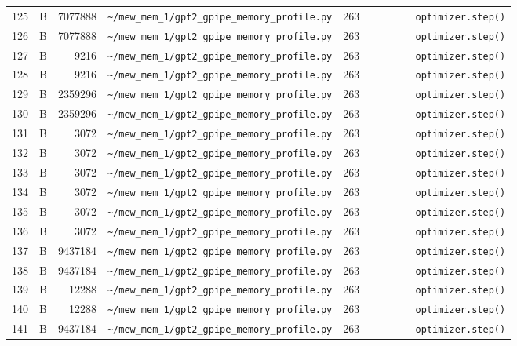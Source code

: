 \documentclass{article}
\begin{document}
\begin{longtable}{r l r p{6.5cm} r p{7.0cm}}
125 & B & 7077888 & \lstinline|~/mew_mem_1/gpt2_gpipe_memory_profile.py| & 263 & \lstinline|        optimizer.step()| \\
126 & B & 7077888 & \lstinline|~/mew_mem_1/gpt2_gpipe_memory_profile.py| & 263 & \lstinline|        optimizer.step()| \\
127 & B & 9216 & \lstinline|~/mew_mem_1/gpt2_gpipe_memory_profile.py| & 263 & \lstinline|        optimizer.step()| \\
128 & B & 9216 & \lstinline|~/mew_mem_1/gpt2_gpipe_memory_profile.py| & 263 & \lstinline|        optimizer.step()| \\
129 & B & 2359296 & \lstinline|~/mew_mem_1/gpt2_gpipe_memory_profile.py| & 263 & \lstinline|        optimizer.step()| \\
130 & B & 2359296 & \lstinline|~/mew_mem_1/gpt2_gpipe_memory_profile.py| & 263 & \lstinline|        optimizer.step()| \\
131 & B & 3072 & \lstinline|~/mew_mem_1/gpt2_gpipe_memory_profile.py| & 263 & \lstinline|        optimizer.step()| \\
132 & B & 3072 & \lstinline|~/mew_mem_1/gpt2_gpipe_memory_profile.py| & 263 & \lstinline|        optimizer.step()| \\
133 & B & 3072 & \lstinline|~/mew_mem_1/gpt2_gpipe_memory_profile.py| & 263 & \lstinline|        optimizer.step()| \\
134 & B & 3072 & \lstinline|~/mew_mem_1/gpt2_gpipe_memory_profile.py| & 263 & \lstinline|        optimizer.step()| \\
135 & B & 3072 & \lstinline|~/mew_mem_1/gpt2_gpipe_memory_profile.py| & 263 & \lstinline|        optimizer.step()| \\
136 & B & 3072 & \lstinline|~/mew_mem_1/gpt2_gpipe_memory_profile.py| & 263 & \lstinline|        optimizer.step()| \\
137 & B & 9437184 & \lstinline|~/mew_mem_1/gpt2_gpipe_memory_profile.py| & 263 & \lstinline|        optimizer.step()| \\
138 & B & 9437184 & \lstinline|~/mew_mem_1/gpt2_gpipe_memory_profile.py| & 263 & \lstinline|        optimizer.step()| \\
139 & B & 12288 & \lstinline|~/mew_mem_1/gpt2_gpipe_memory_profile.py| & 263 & \lstinline|        optimizer.step()| \\
140 & B & 12288 & \lstinline|~/mew_mem_1/gpt2_gpipe_memory_profile.py| & 263 & \lstinline|        optimizer.step()| \\
141 & B & 9437184 & \lstinline|~/mew_mem_1/gpt2_gpipe_memory_profile.py| & 263 & \lstinline|        optimizer.step()| \\

\end{longtable}
\end{document}
